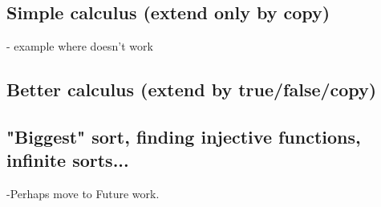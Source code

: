 \subsection{Simple calculus (extend only by copy)}

- example where doesn't work

\subsection{Better calculus (extend by true/false/copy)}

\subsection{ "Biggest" sort, finding injective functions, infinite sorts...}

-Perhaps move to Future work.
